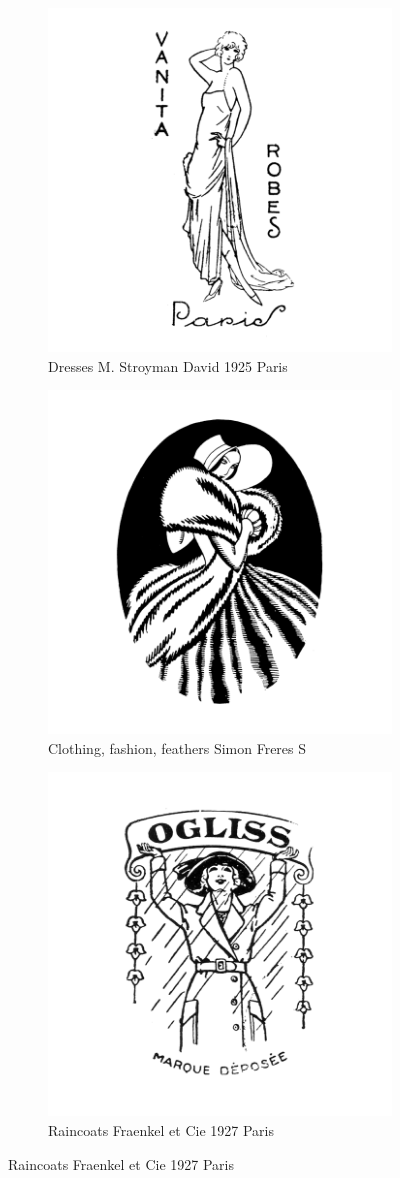 \begin{figure}[h]
  \centering
  \begin{subfigure}{.45\textwidth}
    \centering
    \includegraphics[width=.5\linewidth]{images/supplement/trademarks/french/21_45}
    \caption{Dresses M. Stroyman David 1925 Paris}
    \label{fig:trademarks:french:21.45}
  \end{subfigure}

  \begin{subfigure}{.45\textwidth}
    \centering
    \includegraphics[width=.5\linewidth]{images/supplement/trademarks/french/21_52}
    \caption{Clothing, fashion, feathers Simon Freres S}
    \label{fig:trademarks:french:21.52}
  \end{subfigure}

  \begin{subfigure}{.45\textwidth}
    \centering
    \includegraphics[width=.5\linewidth]{images/supplement/trademarks/french/21_53}
    \caption{Raincoats Fraenkel et Cie 1927 Paris}
    \label{fig:trademarks:french:21.53}
  \end{subfigure}
\end{figure}

